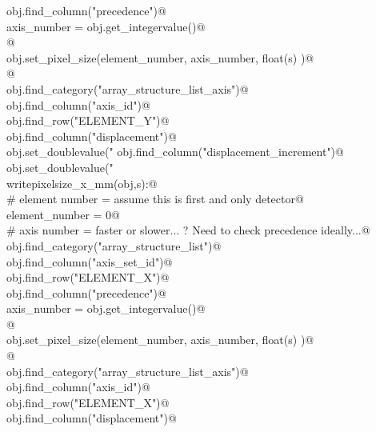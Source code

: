 \documentclass[10pt,a4paper,twoside,notitlepage]{article}
\begin{document}
\begin{flushleft}
\begin{list}{}{}
\mbox{}\verb@    obj.find_column("precedence")@\\
\mbox{}\verb@    axis_number = obj.get_integervalue()@\\
\mbox{}\verb@    @\\
\mbox{}\verb@    obj.set_pixel_size(element_number, axis_number, float(s) )@\\
\mbox{}\verb@    @\\
\mbox{}\verb@    obj.find_category("array_structure_list_axis")@\\
\mbox{}\verb@    obj.find_column("axis_id")@\\
\mbox{}\verb@    obj.find_row("ELEMENT_Y")@\\
\mbox{}\verb@    obj.find_column("displacement")@\\
\mbox{}\verb@    obj.set_doublevalue("%.6g",float(s)/2.0)@\\
\mbox{}\verb@    obj.find_column("displacement_increment")@\\
\mbox{}\verb@    obj.set_doublevalue("%.6g",float(s))@\\
\mbox{}\verb@@\\
\mbox{}\verb@def writepixelsize_x_mm(obj,s):@\\
\mbox{}\verb@    # element number  = assume this is first and only detector@\\
\mbox{}\verb@    element_number = 0@\\
\mbox{}\verb@    # axis number = faster or slower... ? Need to check precedence ideally...@\\
\mbox{}\verb@    obj.find_category("array_structure_list")@\\
\mbox{}\verb@    obj.find_column("axis_set_id")@\\
\mbox{}\verb@    obj.find_row("ELEMENT_X")@\\
\mbox{}\verb@    obj.find_column("precedence")@\\
\mbox{}\verb@    axis_number = obj.get_integervalue()@\\
\mbox{}\verb@    @\\
\mbox{}\verb@    obj.set_pixel_size(element_number, axis_number, float(s) )@\\
\mbox{}\verb@    @\\
\mbox{}\verb@    obj.find_category("array_structure_list_axis")@\\
\mbox{}\verb@    obj.find_column("axis_id")@\\
\mbox{}\verb@    obj.find_row("ELEMENT_X")@\\
\mbox{}\verb@    obj.find_column("displacement")@\\

\end{list}
\end{flushleft}
\end{document}
